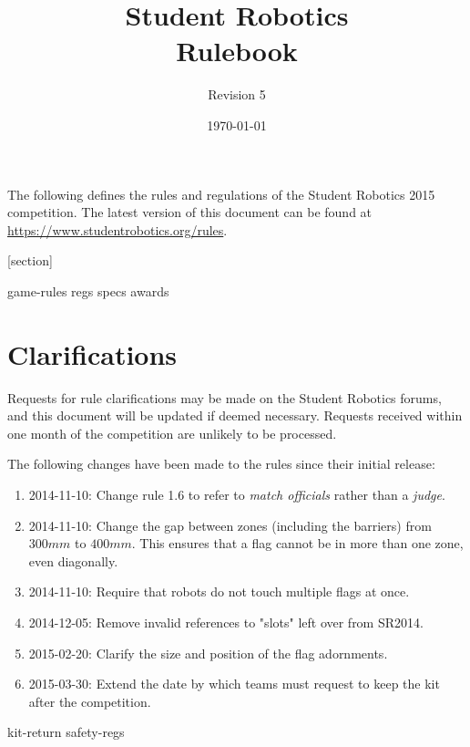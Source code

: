 \documentclass[a4paper, 11pt]{scrartcl}
\title {Student Robotics \sryear\\ Rulebook}
\author{Revision 5}
\date{\today}
\newcommand{\sryear}{2015}
\begin{document}
\maketitle

\noindent The following defines the rules and regulations of the Student Robotics \sryear {} competition.  The latest version of this document can be found at \url{https://www.studentrobotics.org/rules}.

[section]
\newcommand{\rcn}{\stepcounter{rule}\arabic{section}.\arabic{rule}}
\renewcommand{\labelenumi}{\rcn}

 {game-rules}
\newpage
 {regs}
\newpage
 {specs}
\newpage
 {awards}

\renewcommand{\labelenumi}{\rcn}

\section{Clarifications}
Requests for rule clarifications may be made on the Student Robotics forums, and this document will be updated if deemed necessary.  Requests received within one month of the competition are unlikely to be processed.

The following changes have been made to the rules since their initial release:

\begin{enumerate}
  \item 2014-11-10: Change rule 1.6 to refer to \emph{match officials} rather than a \emph{judge}.
  \item 2014-11-10: Change the gap between zones (including the barriers) from $300mm$ to $400mm$.
                    This ensures that a flag cannot be in more than one zone, even diagonally.
  \item 2014-11-10: Require that robots do not touch multiple flags at once.
  \item 2014-12-05: Remove invalid references to "slots" left over from SR2014.
  \item 2015-02-20: Clarify the size and position of the flag adornments.
  \item 2015-03-30: Extend the date by which teams must request to keep the kit after the competition.
\end{enumerate}

\newpage
\appendix
\appendixpage
\addappheadtotoc
 {kit-return}
 {safety-regs}
\end{document}
